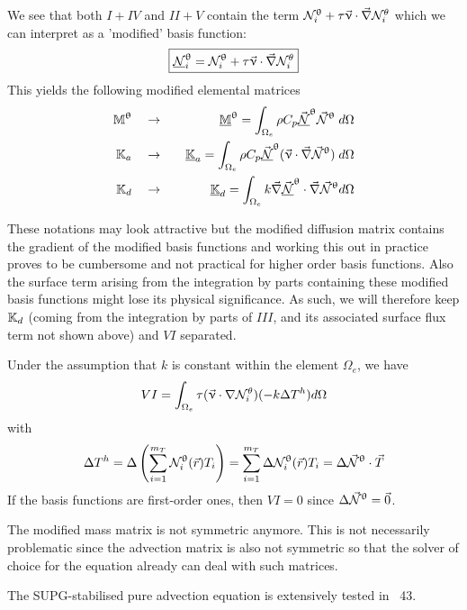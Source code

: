 We see that both $I+IV$ and $II+V$ contain the term ${\mathcal{N}}^\uptheta_i  + \tau \vec\upnu\cdot\vec\nabla {\mathcal{N}}_i^\theta$
which we can interpret as a 'modified' basis function:
\[
\boxed{
\underline{{\mathcal{N}}}^\uptheta_i = {\mathcal{N}}^\uptheta_i  + \tau \vec\upnu\cdot\vec\nabla {\mathcal{N}}_i^\theta
}
\]
This yields the following modified elemental matrices
\begin{eqnarray}
{{\mathbb{M}}}^\uptheta \quad &\rightarrow& \quad \underline{{\mathbb{M}}}^\uptheta
= \int_{\Omega_e} \rho C_p \vec{\underline{{\mathcal{N}}}}^\uptheta \vec{{\mathcal{N}}}^\uptheta \; d\Omega
\\
{{\mathbb{K}}}_a \quad &\rightarrow & \quad \underline{{\mathbb{K}}}_a 
= \int_{\Omega_e} \rho C_p \vec{\underline{{\mathcal{N}}}}^\uptheta ({\vec \upnu}\cdot \vec\nabla \vec{{\mathcal{N}}}^\uptheta) \; d\Omega
\\
{{\mathbb{K}}}_d \quad &\rightarrow&  \quad \underline{{\mathbb{K}}}_d 
=\int_{\Omega_e} k \vec\nabla \vec{\underline{{\mathcal{N}}}}^\uptheta \cdot \vec\nabla \vec{{\mathcal{N}}}^\uptheta d\Omega
\end{eqnarray}


These notations may look attractive but the modified diffusion matrix contains the gradient 
of the modified basis functions and working this out in practice proves to be cumbersome and 
not practical for higher order basis functions. Also the surface term arising from the integration by parts 
containing these modified basis functions might lose its physical significance. 
As such, we will therefore keep ${\mathbb{K}}_d$ (coming from the integration by parts of $III$, and 
its associated surface flux term not shown above) and $VI$ separated. 

Under the assumption that $k$ is constant within the element $\Omega_e$, we have 
\[
VI = \int_{\Omega_e} \tau(\vec\upnu\cdot\nabla {\mathcal{N}}_i^\theta)(- k \Delta T^h ) d\Omega 
\]
with 
\[
\Delta T^h 
= \Delta \left( \sum_{i=1}^{m_T} {\mathcal{N}}^\uptheta_i ({\vec r}) T_i \right)
= \sum_{i=1}^{m_T} \Delta {\mathcal{N}}^\uptheta_i ({\vec r}) T_i 
= \Delta \vec {{\mathcal{N}}}^\uptheta \cdot \vec T
\]
If the basis functions are first-order ones, then $VI=0$ since $\Delta \vec {{\mathcal{N}}}^\uptheta = \vec 0$.  



\begin{remark} 
The modified mass matrix is not symmetric anymore. 
This is not necessarily problematic since the 
advection matrix is also not symmetric so that the solver of choice for the equation already can 
deal with such matrices.
\end{remark} 


The SUPG-stabilised pure advection equation is extensively tested in \stone~43.


